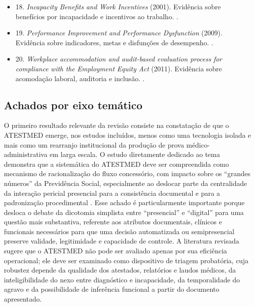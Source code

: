 \documentclass[12pt,a4paper]{article}
\begin{document}
\begin{itemize}
\item 18. \textit{Incapacity Benefits and Work Incentives} (2001). Evidência sobre benefícios por incapacidade e incentivos ao trabalho. \parencite{corden2001incapacitybenefitsandworkincentives}.
\item 19. \textit{Performance Improvement and Performance Dysfunction} (2009). Evidência sobre indicadores, metas e disfunções de desempenho. \parencite{kelman2009performanceimprovementandperformancedysfunctionanemp}.
\item 20. \textit{Workplace accommodation and audit-based evaluation process for compliance with the Employment Equity Act} (2011). Evidência sobre acomodação laboral, auditoria e inclusão. \parencite{deveau2011workplaceaccommodationandauditbasedevaluationprocess}.
\end{itemize}

\subsection{Achados por eixo temático}
\label{sec:org2d7c262}

O primeiro resultado relevante da revisão consiste na constatação de que o ATESTMED emerge, nos estudos incluídos, menos como uma tecnologia isolada e mais como um rearranjo institucional da produção de prova médico-administrativa em larga escala. O estudo diretamente dedicado ao tema demonstra que a sistemática do ATESTMED deve ser compreendida como mecanismo de racionalização do fluxo concessório, com impacto sobre os “grandes números” da Previdência Social, especialmente ao deslocar parte da centralidade da interação pericial presencial para a consistência documental e para a padronização procedimental \parencite{soares20241031t0000000000asistematicadoatestmednaconcessa}. Esse achado é particularmente importante porque desloca o debate da dicotomia simplista entre “presencial” e “digital” para uma questão mais substantiva, referente aos atributos documentais, clínicos e funcionais necessários para que uma decisão automatizada ou semipresencial preserve validade, legitimidade e capacidade de controle. A literatura revisada sugere que o ATESTMED não pode ser avaliado apenas por sua eficiência operacional; ele deve ser examinado como dispositivo de triagem probatória, cuja robustez depende da qualidade dos atestados, relatórios e laudos médicos, da inteligibilidade do nexo entre diagnóstico e incapacidade, da temporalidade do agravo e da possibilidade de inferência funcional a partir do documento apresentado.
\end{document}
